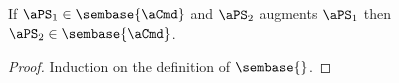 \begin{lemma}
  If $\aPS_1\in\sembase{\aCmd}$ and $\aPS_2$  augments $\aPS_1$ then $\aPS_2\in\sembase{\aCmd}$.

  \vspace{-.5\baselineskip}
  \begin{proof}
    Induction on the definition of $\sembase{}$.
  \end{proof}
\end{lemma}












